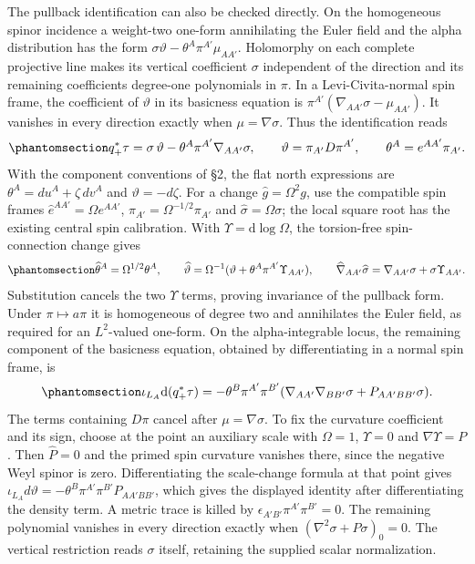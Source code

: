 \documentclass[
  english,
  11pt,
  reqno]{amsart}
\begin{document}
The pullback identification can also be checked directly. On the
homogeneous spinor incidence a weight-two one-form annihilating the
Euler field and the alpha distribution has the form
\(\sigma\vartheta-\theta^A\pi^{A'}\mu_{AA'}\). Holomorphy on each
complete projective line makes its vertical coefficient \(\sigma\)
independent of the direction and its remaining coefficients degree-one
polynomials in \(\pi\). In a Levi-Civita-normal spin frame, the
coefficient of \(\vartheta\) in its basicness equation is
\(\pi^{A'}(\nabla_{AA'}\sigma-\mu_{AA'})\). It vanishes in every
direction exactly when \(\mu=\nabla\sigma\). Thus the identification
reads
\begin{equation}\protect\phantomsection\label{eq:gg-ordinary-section-density}{
 q_+^*\tau=\sigma\,\vartheta
       -\theta^A\pi^{A'}\nabla_{AA'}\sigma,\qquad
 \vartheta=\pi_{A'}D\pi^{A'},\qquad
 \theta^A=e^{AA'}\pi_{A'} .
}\end{equation} With the component conventions of §2, the flat north
expressions are \(\theta^A=du^A+\zeta\,dv^A\) and \(\vartheta=-d\zeta\).
For a change \(\widehat g=\Omega^2g\), use the compatible spin frames
\(\widehat e^{AA'}=\Omega e^{AA'}\),
\(\widehat\pi_{A'}=\Omega^{-1/2}\pi_{A'}\) and
\(\widehat\sigma=\Omega\sigma\); the local square root has the existing
central spin calibration. With \(\Upsilon=\mathrm d\log\Omega\), the
torsion-free spin-connection change gives
\begin{equation}\protect\phantomsection\label{eq:gg-ordinary-section-scale-invariance}{
 \widehat\theta^A=\Omega^{1/2}\theta^A,\qquad
 \widehat\vartheta=\Omega^{-1}
   (\vartheta+\theta^A\pi^{A'}\Upsilon_{AA'}),\qquad
 \widehat\nabla_{AA'}\widehat\sigma
          =\nabla_{AA'}\sigma+\sigma\Upsilon_{AA'}.
}\end{equation} Substitution cancels the two \(\Upsilon\) terms, proving
invariance of the pullback form. Under \(\pi\mapsto a\pi\) it is
homogeneous of degree two and annihilates the Euler field, as required
for an \(L^2\)-valued one-form. On the alpha-integrable locus, the
remaining component of the basicness equation, obtained by
differentiating in a normal spin frame, is
\begin{equation}\protect\phantomsection\label{eq:gg-ordinary-section-basicness}{
 \iota_{L_A}\mathrm d(q_+^*\tau)
 =-\theta^B\pi^{A'}\pi^{B'}
       (\nabla_{AA'}\nabla_{BB'}\sigma+P_{AA'BB'}\sigma).
}\end{equation} The terms containing \(D\pi\) cancel after
\(\mu=\nabla\sigma\). To fix the curvature coefficient and its sign,
choose at the point an auxiliary scale with \(\Omega=1\), \(\Upsilon=0\)
and \(\nabla\Upsilon=P\). Then \(\widehat P=0\) and the primed spin
curvature vanishes there, since the negative Weyl spinor is zero.
Differentiating the scale-change formula at that point gives
\(\iota_{L_A}d\vartheta=-\theta^B\pi^{A'}\pi^{B'}P_{AA'BB'}\), which
gives the displayed identity after differentiating the density term. A
metric trace is killed by \(\epsilon_{A'B'}\pi^{A'}\pi^{B'}=0\). The
remaining polynomial vanishes in every direction exactly when
\((\nabla^2\sigma+P\sigma)_0=0\). The vertical restriction reads
\(\sigma\) itself, retaining the supplied scalar normalization.
\end{document}
